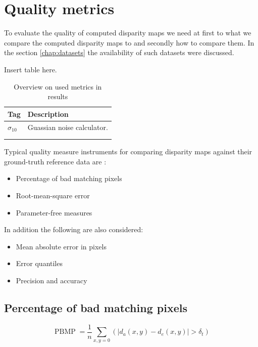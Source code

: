 
\section{Quality metrics}

To evaluate the quality of computed disparity maps we need at first to what we compare the computed disparity maps to and secondly how to compare them. In the section \ref{chap:datasets} the availability of such datasets were discussed.

Insert table here.

\begin{table}[h!]
\centering
\begin{tabular}{l|l}
\textbf{Tag} & \textbf{Description} \\ \hline
$\sigma_{10}$ & Guassian noise calculator. \\ \hline
 &  \\ \hline
 &  \\
\end{tabular}
\caption{Overview on used metrics in results}
\label{tab:metrics}
\end{table}

\noindent Typical quality measure instruments for comparing disparity maps against their ground-truth reference data are  \citep{cyganek2011introduction}:

\begin{itemize}
  \item Percentage of bad matching pixels
  \item Root-mean-square error
  \item Parameter-free measures
\end{itemize}

In addition the following are also considered:

\begin{itemize}
  \item Mean absolute error in pixels
  \item Error quantiles
  \item Precision and accuracy
\end{itemize}

\subsection*{Percentage of bad matching pixels}

\begin{equation}
  \operatorname{PBMP}=\frac{1}{n} \sum_{x,y=0}^{}(|d_a(x,y) - d_e(x,y)| > \delta_t)
\end{equation}


